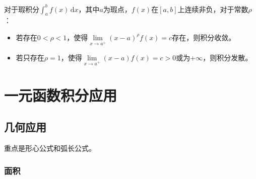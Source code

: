 \documentclass[UTF8, 12pt]{ctexart}
\begin{document}
对于瑕积分$\int_a^bf(x)\,\textrm{d}x$，其中$a$为瑕点，$f(x)$在$[a,b]$上连续非负，对于常数$\rho$：

\begin{itemize}
    \item 若存在$0<\rho<1$，使得$\lim\limits_{x\to a^+}(x-a)^\rho f(x)=c$存在，则积分收敛。
    \item 若只存在$\rho=1$，使得$\lim\limits_{x\to a^+}(x-a)f(x)=c>0$或为$+\infty$，则积分发散。
\end{itemize}









\section{一元函数积分应用}

\subsection{几何应用}

重点是形心公式和弧长公式。

\subsubsection{面积}
\end{document}
